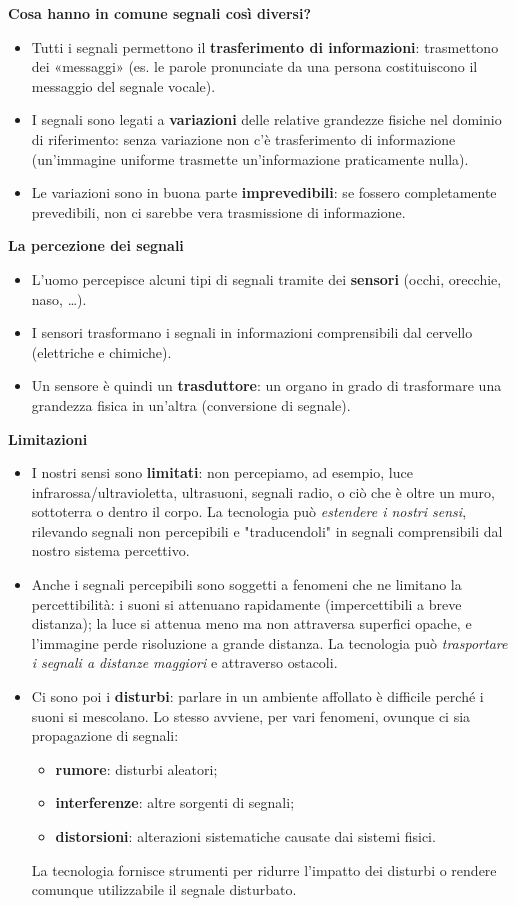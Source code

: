 \documentclass[12pt, a4paper]{article}
\begin{document}
\textbf{Cosa hanno in comune segnali così diversi?}
\begin{itemize}
    \item Tutti i segnali permettono il \textbf{trasferimento di informazioni}: trasmettono dei «messaggi» (es. le parole pronunciate da una persona costituiscono il messaggio del segnale vocale).
    \item I segnali sono legati a \textbf{variazioni} delle relative grandezze fisiche nel dominio di riferimento: senza variazione non c'è trasferimento di informazione (un'immagine uniforme trasmette un'informazione praticamente nulla).
    \item Le variazioni sono in buona parte \textbf{imprevedibili}: se fossero completamente prevedibili, non ci sarebbe vera trasmissione di informazione.
\end{itemize}

\textbf{La percezione dei segnali}
\begin{itemize}
    \item L'uomo percepisce alcuni tipi di segnali tramite dei \textbf{sensori} (occhi, orecchie, naso, \dots).
    \item I sensori trasformano i segnali in informazioni comprensibili dal cervello (elettriche e chimiche).
    \item Un sensore è quindi un \textbf{trasduttore}: un organo in grado di trasformare una grandezza fisica in un'altra (conversione di segnale).
\end{itemize}

\textbf{Limitazioni}
\begin{itemize}
    \item I nostri sensi sono \textbf{limitati}: non percepiamo, ad esempio, luce infrarossa/ultravioletta, ultrasuoni, segnali radio, o ciò che è oltre un muro, sottoterra o dentro il corpo. La tecnologia può \textit{estendere i nostri sensi}, rilevando segnali non percepibili e "traducendoli" in segnali comprensibili dal nostro sistema percettivo.
    \item Anche i segnali percepibili sono soggetti a fenomeni che ne limitano la percettibilità: i suoni si attenuano rapidamente (impercettibili a breve distanza); la luce si attenua meno ma non attraversa superfici opache, e l'immagine perde risoluzione a grande distanza. La tecnologia può \textit{trasportare i segnali a distanze maggiori} e attraverso ostacoli.
    \item Ci sono poi i \textbf{disturbi}: parlare in un ambiente affollato è difficile perché i suoni si mescolano. Lo stesso avviene, per vari fenomeni, ovunque ci sia propagazione di segnali:
    \begin{itemize}
        \item \textbf{rumore}: disturbi aleatori;
        \item \textbf{interferenze}: altre sorgenti di segnali;
        \item \textbf{distorsioni}: alterazioni sistematiche causate dai sistemi fisici.
    \end{itemize}
    La tecnologia fornisce strumenti per ridurre l'impatto dei disturbi o rendere comunque utilizzabile il segnale disturbato.
\end{itemize}
\end{document}
